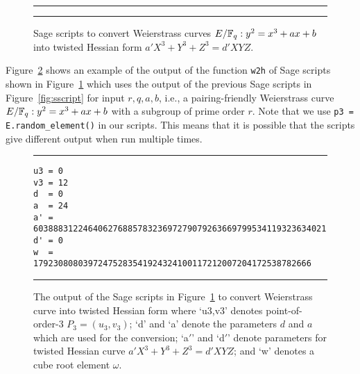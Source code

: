 \begin{figure}
\hrule\medskip
{}
\hrule
\caption{Sage scripts to convert Weierstrass curves $E/\mathbb{F}_{q}: y^2 = x^3 + ax + b$
into twisted Hessian form $a'X^3 + Y^3 + Z^3 = d'XYZ$.}
\label{fig:scon}
\end{figure}

Figure~\ref{fig:conout} shows an example of the output of the function \texttt{w2h} of Sage scripts shown in Figure~\ref{fig:scon}
which uses the output of the previous Sage scripts in Figure~\ref{fig:sscript} for input $r,q,a,b$,
i.e., a pairing-friendly Weierstrass curve $E/\mathbb{F}_{q}: y^2 = x^3 + ax + b$ with a subgroup of prime order $r$.
Note that we use \texttt{p3 = E.random\_element()} in our scripts.
This means that it is possible that the scripts give different output when run multiple times.

\begin{figure}
\hrule\medskip
{\scriptsize
\begin{verbatim}
u3 = 0
v3 = 12
d  = 0
a  = 24
a' = 60388831224640627688578323697279079263669799534119323634021
d' = 0
w  = 17923080803972475283541924324100117212007204172538782666
\end{verbatim}
}
\hrule
\caption{The output of the Sage scripts in Figure~\ref{fig:scon}
to convert Weierstrass curve into twisted Hessian form where
`u3,v3' denotes point-of-order-3 $P_3 = (u_3,v_3)$;
`d' and `a' denote the parameters $d$ and $a$ which are used for the conversion;
`a$'$' and `d$'$' denote parameters for twisted Hessian curve $a'X^3 + Y^3 + Z^3 = d'XYZ$; and
`w' denotes a cube root element $\omega$.
}
\label{fig:conout}
\end{figure}

